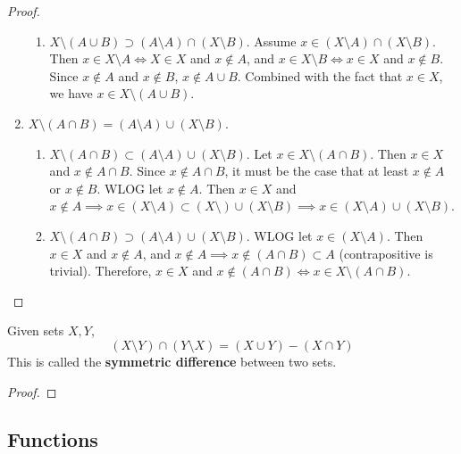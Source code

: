 \begin{proof}
\begin{enumerate}
\begin{enumerate}
          \item $X \setminus (A \cup B) \supset (A \setminus A) \cap (X \setminus B)$. Assume $x \in (X \setminus A) \cap (X \setminus B)$. Then $x \in X \setminus A \iff X \in X$ and $x \not\in A$, and $x \in X \setminus B \iff x \in X$ and $x \not\in B$. Since $x \not\in A$ and $x \not\in B$, $x \not\in A \cup B$. Combined with the fact that $x \in X$, we have $x \in X \setminus (A \cup B)$. 
        \end{enumerate}

      \item $X \setminus (A \cap B) = (A \setminus A) \cup (X \setminus B)$.
        \begin{enumerate}
          \item $X \setminus (A \cap B) \subset (A \setminus A) \cup (X \setminus B)$. Let $x \in X \setminus (A \cap B)$. Then $x \in X$ and $x \not\in A \cap B$. Since $x \not\in A \cap B$, it must be the case that at least $x \not\in A$ or $x \not\in B$. WLOG let $x \not\in A$. Then $x \in X$ and $x \not\in A \implies x \in (X \setminus A) \subset (X \setminus) \cup (X \setminus B) \implies x \in (X \setminus A) \cup (X \setminus B)$. 

          \item $X \setminus (A \cap B) \supset (A \setminus A) \cup (X \setminus B)$. WLOG let $x \in (X \setminus A)$. Then $x \in X$ and $x \not\in A$, and $x \not\in A \implies x \not\in (A \cap B) \subset A$ (contrapositive is trivial). Therefore, $x \in X$ and $x \not\in (A \cap B) \iff  x \in X \setminus (A \cap B)$. 
        \end{enumerate}
    \end{enumerate}
  \end{proof} 

  \begin{corollary}
    Given sets $X, Y$, 
    \begin{equation}
      (X \setminus Y) \cap (Y \setminus X) = (X \cup Y) - (X \cap Y)
    \end{equation}
    This is called the \textbf{symmetric difference} between two sets. 
  \end{corollary}
  \begin{proof}
    
  \end{proof} 

\subsection{Functions}

